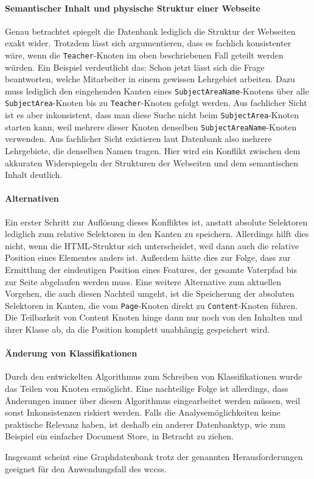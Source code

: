     \paragraph{Semantischer Inhalt und physische Struktur einer Webseite}
    Genau betrachtet spiegelt die Datenbank lediglich die Struktur der Webseiten exakt wider.
    Trotzdem lässt sich argumentieren, dass es fachlich konsistenter wäre,
    wenn die \texttt{Teacher}-Knoten im oben beschriebenen Fall geteilt werden würden.
    Ein Beispiel verdeutlicht das:
    Schon jetzt lässt sich die Frage beantworten,
    welche Mitarbeiter in einem gewissen Lehrgebiet arbeiten.
    Dazu muss lediglich den eingehenden Kanten eines
    \texttt{SubjectAreaName}-Knotens über alle \texttt{SubjectArea}-Knoten
    bis zu \texttt{Teacher}-Knoten gefolgt werden.
    Aus fachlicher Sicht ist es aber inkonsistent,
    dass man diese Suche nicht beim \texttt{SubjectArea}-Knoten
    starten kann, weil mehrere dieser Knoten denselben
    \texttt{SubjectAreaName}-Knoten verwenden.
    Aus fachlicher Sicht existieren laut Datenbank also mehrere Lehrgebiete,
    die denselben Namen tragen.
    Hier wird ein Konflikt zwischen dem akkuraten Widerspiegeln der Strukturen der Webseiten
    und dem semantischen Inhalt deutlich.

    \paragraph{Alternativen}
    Ein erster Schritt zur Auflösung dieses Konfliktes ist, anstatt absolute Selektoren
    lediglich zum {\parentFeature} relative Selektoren in den Kanten zu speichern.
    Allerdings hilft dies nicht, wenn die HTML-Struktur sich unterscheidet,
    weil dann auch die relative Position eines Elementes anders ist.
    Außerdem hätte dies zur Folge, dass zur Ermittlung der eindeutigen Position
    eines Features, der gesamte Vaterpfad bis zur Seite abgelaufen werden muss.
    Eine weitere Alternative zum aktuellen Vorgehen,
    die auch diesen Nachteil umgeht,
    ist die Speicherung der absoluten Selektoren in Kanten,
    die vom \texttt{Page}-Knoten direkt zu \texttt{Content}-Knoten führen.
    Die Teilbarkeit von Content Knoten hinge dann nur noch von den Inhalten und ihrer Klasse ab,
    da die Position komplett unabhängig gespeichert wird.

    \paragraph{Änderung von Klassifikationen}
    Durch den entwickelten Algorithmus zum Schreiben von Klassifikationen
    wurde das Teilen von Knoten ermöglicht.
    Eine nachteilige Folge ist allerdings,
    dass Änderungen immer über diesen Algorithmus eingearbeitet werden müssen,
    weil sonst Inkonsistenzen riskiert werden.
    Falls die Analysemöglichkeiten keine praktische Relevanz haben,
    ist deshalb ein anderer Datenbanktyp, wie zum Beispiel ein einfacher Document Store,
    in Betracht zu ziehen.

    Insgesamt scheint eine Graphdatenbank trotz der genannten Herausforderungen geeignet
    für den Anwendungsfall des \glspl{wccs}.
